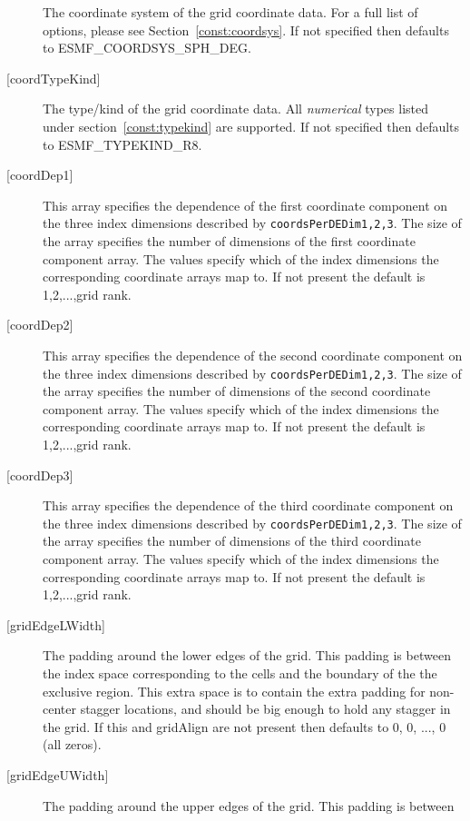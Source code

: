 \begin{description}
       The coordinate system of the grid coordinate data.
       For a full list of options, please see Section~\ref{const:coordsys}.
       If not specified then defaults to ESMF\_COORDSYS\_SPH\_DEG.
   \item[{[coordTypeKind]}]
       The type/kind of the grid coordinate data. All {\em numerical} types
       listed under section~\ref{const:typekind} are supported.
       If not specified then defaults to ESMF\_TYPEKIND\_R8.
   \item[{[coordDep1]}]
       This array specifies the dependence of the first
       coordinate component on the three index dimensions
       described by {\tt coordsPerDEDim1,2,3}. The size of the
       array specifies the number of dimensions of the first
       coordinate component array. The values specify which
       of the index dimensions the corresponding coordinate
       arrays map to. If not present the default is 1,2,...,grid rank.
   \item[{[coordDep2]}]
       This array specifies the dependence of the second
       coordinate component on the three index dimensions
       described by {\tt coordsPerDEDim1,2,3}. The size of the
       array specifies the number of dimensions of the second
       coordinate component array. The values specify which
       of the index dimensions the corresponding coordinate
       arrays map to. If not present the default is 1,2,...,grid rank.
   \item[{[coordDep3]}]
       This array specifies the dependence of the third
       coordinate component on the three index dimensions
       described by {\tt coordsPerDEDim1,2,3}. The size of the
       array specifies the number of dimensions of the third
       coordinate component array. The values specify which
       of the index dimensions the corresponding coordinate
       arrays map to. If not present the default is 1,2,...,grid rank.
   \item[{[gridEdgeLWidth]}]
        The padding around the lower edges of the grid. This padding is between
        the index space corresponding to the cells and the boundary of the
        the exclusive region. This extra space is to contain the extra
        padding for non-center stagger locations, and should be big enough
        to hold any stagger in the grid. If this and gridAlign are not present then
        defaults to 0, 0, ..., 0 (all zeros).
   \item[{[gridEdgeUWidth]}]
        The padding around the upper edges of the grid. This padding is between

\end{description}
